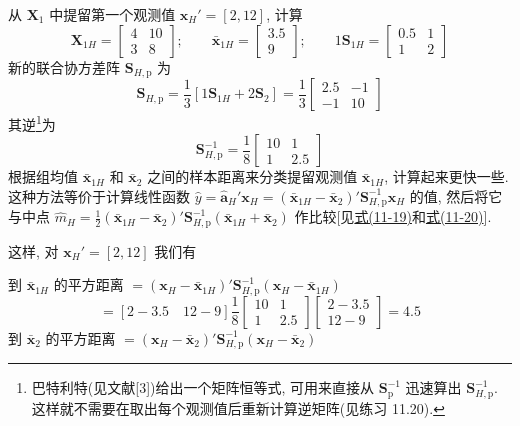 从 $\mathbf{X}_1$ 中提留第一个观测值 $\mathbf{x}_H'=[2,12]$, 计算
\[
\mathbf{X}_{1H}=\begin{bmatrix}4&10\\3&8\end{bmatrix};\qquad \bar{\mathbf{x}}_{1H}=\begin{bmatrix}3.5\\9\end{bmatrix};\qquad 1\mathbf{S}_{1H}=\begin{bmatrix}0.5&1\\1&2\end{bmatrix}
\]
新的联合协方差阵 $\mathbf{S}_{H,\mathrm{p}}$ 为
\[
\mathbf{S}_{H,\mathrm{p}}=\frac{1}{3}[1\mathbf{S}_{1H}+2\mathbf{S}_2]=\frac{1}{3}\begin{bmatrix}2.5&-1\\-1&10\end{bmatrix}
\]
其逆\footnote{巴特利特(见文献[3])给出一个矩阵恒等式, 可用来直接从 $\mathbf{S}_{\mathrm{p}}^{-1}$ 迅速算出 $\mathbf{S}_{H,\mathrm{p}}^{-1}$. 这样就不需要在取出每个观测值后重新计算逆矩阵(见练习 11.20).}为
\[
\mathbf{S}_{H,\mathrm{p}}^{-1}=\frac{1}{8}\begin{bmatrix}10&1\\1&2.5\end{bmatrix}
\]
根据组均值 $\bar{\mathbf{x}}_{1H}$ 和 $\bar{\mathbf{x}}_2$ 之间的样本距离来分类提留观测值 $\bar{\mathbf{x}}_{1H}$, 计算起来更快一些. 这种方法等价于计算线性函数 $\hat{y}=\hat{\mathbf{a}}_{H}'\mathbf{x}_H=(\bar{\mathbf{x}}_{1H}-\bar{\mathbf{x}}_2)'\mathbf{S}_{H,\mathrm{p}}^{-1}\mathbf{x}_H$ 的值, 然后将它与中点 $\hat{m}_{H}=\frac{1}{2}(\bar{\mathbf{x}}_{1H}-\bar{\mathbf{x}}_2)'\mathbf{S}_{H,\mathrm{p}}^{-1}(\bar{\mathbf{x}}_{1H}+\bar{\mathbf{x}}_2)$ 作比较[见\hyperref[eq:11-19]{式(11-19)}和\hyperref[eq:11-20]{式(11-20)}].

这样, 对 $\mathbf{x}_H'=[2,12]$ 我们有

到 $\bar{\mathbf{x}}_{1H}$ 的平方距离 $=(\mathbf{x}_H-\bar{\mathbf{x}}_{1H})'\mathbf{S}_{H,\mathrm{p}}^{-1}(\mathbf{x}_H-\bar{\mathbf{x}}_{1H})$
\[
=[2-3.5\quad 12-9]\frac{1}{8}\begin{bmatrix}10&1\\1&2.5\end{bmatrix}\begin{bmatrix}2-3.5\\12-9\end{bmatrix}=4.5
\]
到 $\bar{\mathbf{x}}_2$ 的平方距离 $=(\mathbf{x}_H-\bar{\mathbf{x}}_2)'\mathbf{S}_{H,\mathrm{p}}^{-1}(\mathbf{x}_H-\bar{\mathbf{x}}_2)$
